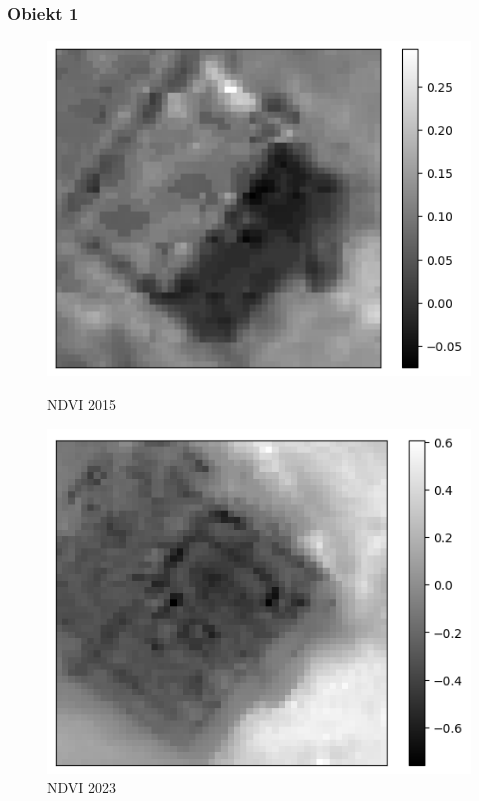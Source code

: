 \documentclass[a4paper,12pt]{article}  %
\begin{document}
\subsubsection{Obiekt 1}
\begin{figure}[H]
    \centering
    \begin{minipage}{0.45\textwidth}
        \centering
        \includegraphics[width=\linewidth]{spektralne/ndvi_budynek7_2015.png}
        \caption*{NDVI 2015}
    \end{minipage}
    \begin{minipage}{0.45\textwidth}
        \centering
        \includegraphics[width=\linewidth]{spektralne/ndvi_budynek7_2023.png}
        \caption*{NDVI 2023}
    \end{minipage}
\end{figure}
\end{document}
